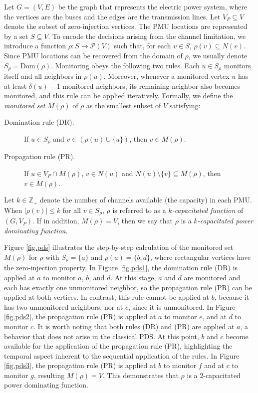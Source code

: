 \documentclass{article}
\newcommand{\ZZ}{{\mathbb Z}}
\newcommand{\PP}{{\mathcal P}}
\begin{document}
Let $G=(V,E)$ be the graph that represents the electric power system, where the vertices are the buses and the edges are the transmission lines. 
Let $V_P \subseteq V$ denote the subset of zero-injection vertices.
The PMU locations are represented by a set $S \subseteq V$.
To encode the decisions arising from the channel limitation, we introduce a function $\rho: S \to \PP(V)$ such that, for each $v \in S$, $\rho(v) \subseteq N(v)$.
Since PMU locations can be recovered from the domain of $\rho$, we usually denote $S_{\rho} = \text{Dom}(\rho)$.
Monitoring obeys the following two rules.
Each $u \in S_{\rho}$ monitors itself and all neighbors in $\rho(u)$.
Moreover, whenever a monitored vertex $u$ has at least $\delta(u) - 1$ monitored neighbors, its remaining neighbor also becomes monitored, and this rule can be applied iteratively.
Formally, we define the \emph{monitored set} $M(\rho)$ of $\rho$ as the smallest subset of $V$ satisfying:
\begin{description}
    \item[Domination rule (DR).] If $u \in S_{\rho}$ and $v \in (\rho(u) \cup \{u\})$, then $v \in M(\rho)$.
    \item[Propagation rule (PR).] If $u \in V_P \cap M(\rho)$, $v \in N(u)$ and $N(u) \setminus \{v\} \subseteq M(\rho)$, then $v \in M(\rho)$.
\end{description}
Let $k \in \ZZ_+$ denote the number of channels available (the capacity) in each PMU.
When $|\rho(v)| \leq k$ for all $v \in S_{\rho}$, $\rho$ is referred to as a \emph{$k$-capacitated function} of $(G,V_P)$. If in addition, $M(\rho) = V$, then we say that $\rho$ is a \emph{$k$-capacitated power dominating function}.


Figure \ref{fig.pds} illustrates the step-by-step calculation of the monitored set $M(\rho)$ for $\rho$ with $S_{\rho} = \{a\}$ and $\rho(a) = \{b,d\}$, where rectangular vertices have the zero-injection property.
In Figure \ref{fig.pds1}, the domination rule (DR) is applied at $a$ to monitor $a$, $b$, and $d$.
At this stage, $a$ and $d$ are monitored and each has exactly one unmonitored neighbor, so the propagation rule (PR) can be applied at both vertices.
In contrast, this rule cannot be applied at $b$, because it has two unmonitored neighbors, nor at $c$, since it is unmonitored.
In Figure \ref{fig.pds2}, the propagation rule (PR) is applied at $a$ to monitor $e$, and at $d$ to monitor $c$.
It is worth noting that both rules (DR) and (PR) are applied at $a$, a behavior that does not arise in the classical PDS.
At this point, $b$ and $c$ become available for the application of the propagation rule (PR), highlighting the temporal aspect inherent to the sequential application of the rules.
In Figure \ref{fig.pds3}, the propagation rule (PR) is applied at $b$ to monitor $f$ and at $c$ to monitor $g$, resulting $M(\rho) = V$.
This demonstrates that $\rho$ is a 2-capacitated power dominating function.
\end{document}
